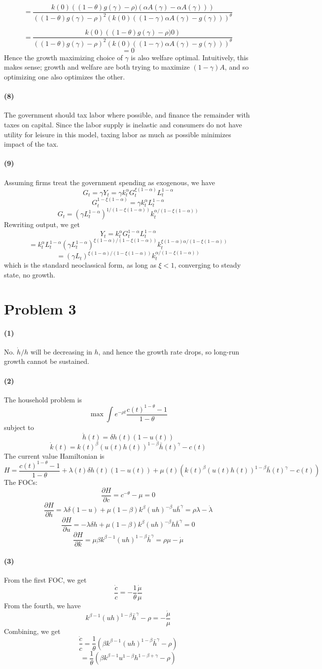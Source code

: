 \documentclass[10pt,letter]{article}
\newcommand{\problem}[1]{\section*{Problem #1}}
\newcommand{\problempart}[1]{\paragraph{#1}}
\begin{document}
\[ =\frac{k(0) \left((1-\theta)g(\gamma) - \rho)\left(\alpha A(\gamma) -\alpha A(\gamma)\right) \right)}{((1-\theta)g(\gamma) - \rho)^2\left(k(0)((1-\gamma)\alpha A(\gamma) - g(\gamma))\right)^{\theta}} \]

\[ =\frac{k(0) \left((1-\theta)g(\gamma) - \rho)0\right)}{((1-\theta)g(\gamma) - \rho)^2\left(k(0)((1-\gamma)\alpha A(\gamma) - g(\gamma))\right)^{\theta}} \]
\[ = 0 \]
Hence the growth maximizing choice of $\gamma$ is also welfare optimal. Intuitively, this makes sense; growth and welfare are both trying to maximize $(1-\gamma)A$, and so optimizing one also optimizes the other.
\problempart{(8)}
The government should tax labor where possible, and finance the remainder with taxes on capital. Since the labor supply is inelastic and consumers do not have utility for leisure in this model, taxing labor as much as possible minimizes impact of the tax.
\problempart{(9)}

Assuming firms treat the government spending as exogenous, we have
\[ G_t = \gamma Y_t = \gamma k_t^\alpha G_t^{\xi(1-\alpha)} L_t^{1-\alpha} \]
\[ G_t ^{1 - \xi(1-\alpha)} = \gamma k_t^\alpha L_t^{1-\alpha} \]
\[ G_t = (\gamma L_t^{1-\alpha})^{1/(1 - \xi(1-\alpha))} k_t^{\alpha/(1 - \xi(1-\alpha))} \]
Rewriting output, we get
\[ Y_t =k_t^\alpha G_t^{1-\alpha} L_t^{1-\alpha} \]
\[=  k_t^\alpha L_t^{1-\alpha} (\gamma L_t^{1-\alpha})^{\xi(1-\alpha)/(1 - \xi(1-\alpha))} k_t^{\xi(1-\alpha)\alpha/(1 - \xi(1-\alpha))} \]
\[ = (\gamma L_t)^{\xi(1-\alpha)/(1 - \xi(1-\alpha))} k_t^{\alpha /(1 - \xi(1-\alpha))} \]
which is the standard neoclassical form, as long as $\xi < 1$, converging to steady state, no growth.
\pagebreak
\problem{3}

\problempart{(1)}
No. $\dot{h}/h$ will be decreasing in $h$, and hence the growth rate drops, so long-run growth cannot be sustained.
\problempart{(2)}
The household problem is
\[ \max \int e^{-\rho t} \frac{c(t)^{1-\theta} - 1}{1-\theta} \]
subject to
\[ \dot{h}(t) = \delta h(t)(1-u(t)) \]
\[ \dot{k}(t) = k(t)^\beta (u(t)h(t))^{1-\beta}\bar{h}(t)^\gamma - c(t) \]
The current value Hamiltonian is
\[ H = \frac{c(t)^{1-\theta} - 1}{1-\theta} + \lambda(t)\delta h(t)(1-u(t)) + \mu(t) (k(t)^\beta (u(t)h(t))^{1-\beta}\bar{h}(t)^\gamma - c(t)) \]
The FOCs:
\[ \frac{\partial H}{\partial c} = c^{-\theta} - \mu = 0 \]
\[ \frac{\partial H}{\partial h} = \lambda \delta (1-u) + \mu (1-\beta) k^\beta (uh)^{-\beta}u\bar{h}^\gamma = \rho \lambda - \dot{\lambda} \]
\[ \frac{\partial H}{\partial u} = - \lambda \delta h + \mu (1-\beta)k^\beta (uh)^{-\beta}h \bar{h}^\gamma = 0  \]
\[ \frac{\partial H}{\partial k} = \mu \beta k^{\beta - 1}(u h )^{1-\beta}\bar{h}^\gamma = \rho \mu - \dot{\mu} \]
\problempart{(3)}
From the first FOC, we get
\[ \frac{\dot{c}}{c}= -\frac{1}{\theta} \frac{\dot{\mu}}{\mu} \]
From the fourth, we have
\[ k^{\beta - 1}(u h )^{1-\beta}\bar{h}^\gamma - \rho = - \frac{\dot{\mu}}{\mu} \]
Combining, we get
\[ \frac{\dot{c}}{c}= \frac{1}{\theta} \left( \beta k^{\beta - 1}(u h )^{1-\beta}\bar{h}^\gamma - \rho  \right) \]
\[ = \frac{1}{\theta} \left( \beta k^{\beta - 1}u^{1-\beta}h^{1-\beta+\gamma} - \rho  \right)  \]
\end{document}
